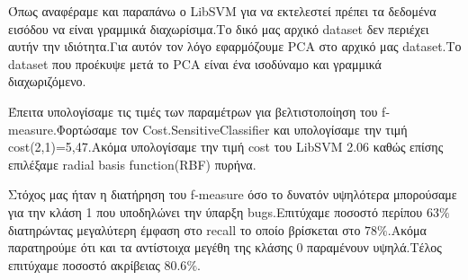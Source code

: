 Όπως αναφέραμε και παραπάνω ο LibSVM για να εκτελεστεί πρέπει τα δεδομένα εισόδου να είναι γραμμικά διαχωρίσιμα.Το δικό μας αρχικό dataset δεν περιέχει αυτήν την ιδιότητα.Για αυτόν τον λόγο εφαρμόζουμε PCA στο αρχικό μας dataset.Το dataset που προέκυψε μετά το PCA είναι ένα ισοδύναμο και γραμμικά διαχωριζόμενο.

Έπειτα υπολογίσαμε τις τιμές των παραμέτρων για βελτιστοποίηση του f-measure.Φορτώσαμε τον Cost.SensitiveClassifier και υπολογίσαμε την τιμή cost(2,1)=5,47.Ακόμα υπολογίσαμε την τιμή cost του LibSVM 2.06 καθώς επίσης επιλέξαμε radial basis function(RBF) πυρήνα.

Στόχος μας ήταν η διατήρηση του f-measure όσο το δυνατόν υψηλότερα μπορούσαμε για την κλάση 1 που υποδηλώνει την ύπαρξη bugs.Επιτύχαμε ποσοστό περίπου $63\%$ διατηρώντας μεγαλύτερη έμφαση στο recall το οποίο βρίσκεται στο $78\%$.Ακόμα παρατηρούμε ότι και τα αντίστοιχα μεγέθη της κλάσης 0 παραμένουν υψηλά.Τέλος επιτύχαμε ποσοστό ακρίβειας $80.6\%$.